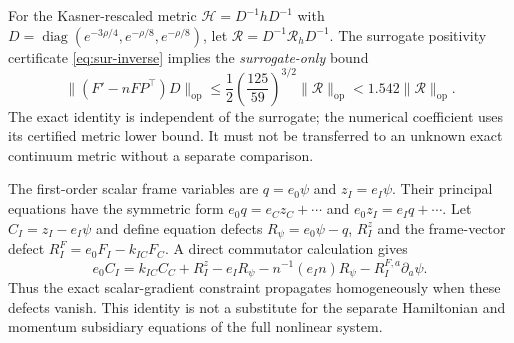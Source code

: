 \documentclass[11pt,a4paper]{article}
\theoremstyle{remark}
\newcommand{\op}{\mathrm{op}}
\begin{document}
For the Kasner-rescaled metric $\mathcal H=D^{-1}hD^{-1}$ with $D=\operatorname{diag}(e^{-3\rho/4},e^{-\rho/8},e^{-\rho/8})$, let $\mathcal R=D^{-1}\mathcal R_hD^{-1}$. The surrogate positivity certificate \eqref{eq:sur-inverse} implies the \emph{surrogate-only} bound
\begin{equation}\label{eq:newRtransfer}
\| (F'-nFP^\top)D\|_{\op}
\le\frac12\left(\frac{125}{59}\right)^{3/2}\|\mathcal R\|_{\op}
<1.542\|\mathcal R\|_{\op}.
\end{equation}
The exact identity is independent of the surrogate; the numerical coefficient uses its certified metric lower bound. It must not be transferred to an unknown exact continuum metric without a separate comparison.

The first-order scalar frame variables are $q=e_0\psi$ and $z_I=e_I\psi$. Their principal equations have the symmetric form $e_0q=e_Cz_C+\cdots$ and $e_0z_I=e_Iq+\cdots$. Let $C_I=z_I-e_I\psi$ and define equation defects $R_\psi=e_0\psi-q$, $R_I^z$ and the frame-vector defect $R_I^F=e_0F_I-k_{IC}F_C$. A direct commutator calculation gives
\begin{equation}\label{eq:newscalarC}
e_0 C_I=k_{IC}C_C+R_I^z-e_I R_\psi
-n^{-1}(e_In)R_\psi-R_I^{F,a}\partial_a\psi.
\end{equation}
Thus the exact scalar-gradient constraint propagates homogeneously when these defects vanish. This identity is not a substitute for the separate Hamiltonian and momentum subsidiary equations of the full nonlinear system.
\end{document}
